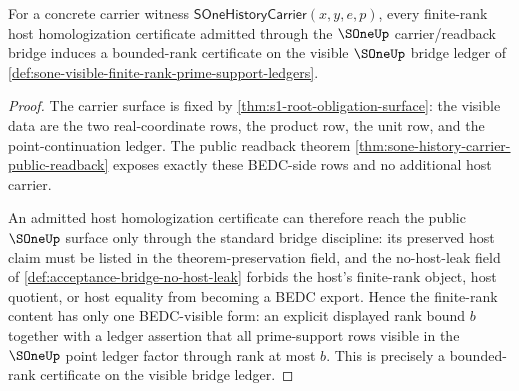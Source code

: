 \begin{lemma}
\label{lem:sone-finite-rank-host-induces-bounded-visible-rank}
For a concrete carrier witness $\mathsf{SOneHistoryCarrier}(x,y,e,p)$, every
finite-rank host homologization certificate admitted through the $\SOneUp$
carrier/readback bridge induces a bounded-rank certificate on the visible
$\SOneUp$ bridge ledger of
\autoref{def:sone-visible-finite-rank-prime-support-ledgers}.
\end{lemma}
\begin{proof}
The carrier surface is fixed by \autoref{thm:s1-root-obligation-surface}: the
visible data are the two real-coordinate rows, the product row, the unit row,
and the point-continuation ledger. The public readback theorem
\autoref{thm:sone-history-carrier-public-readback} exposes exactly these
BEDC-side rows and no additional host carrier.

An admitted host homologization certificate can therefore reach the public
$\SOneUp$ surface only through the standard bridge discipline: its preserved
host claim must be listed in the theorem-preservation field, and the
no-host-leak field of \autoref{def:acceptance-bridge-no-host-leak} forbids the
host's finite-rank object, host quotient, or host equality from becoming a
BEDC export. Hence the finite-rank content has only one BEDC-visible form: an
explicit displayed rank bound $b$ together with a ledger assertion that all
prime-support rows visible in the $\SOneUp$ point ledger factor through rank at
most $b$. This is precisely a bounded-rank certificate on the visible bridge
ledger.
\end{proof}

